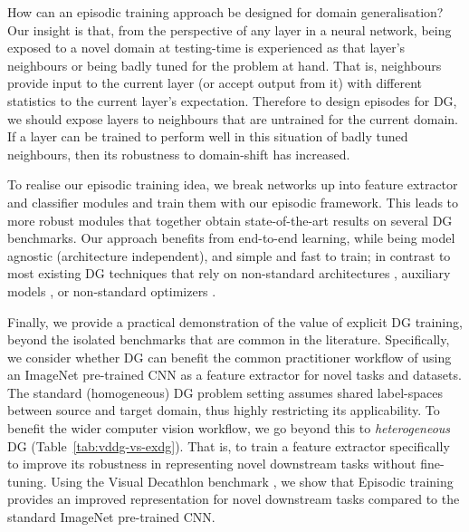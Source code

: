 \documentclass[10pt,twocolumn,letterpaper]{article}
\begin{document}
How can an episodic training approach be designed for domain generalisation? Our insight is that, from the perspective of any layer  in a neural network, being exposed to a novel domain at testing-time is experienced as that layer's neighbours  or  being badly tuned for the problem at hand. That is,  neighbours provide input to the current layer (or accept output from it) with different statistics to the current layer's expectation. Therefore to design episodes for DG, we should expose layers to neighbours that are untrained for the current domain. If a layer can be trained to perform  well in this situation of badly tuned neighbours, then its robustness to domain-shift has increased. 

To realise our episodic training idea, we break networks up into feature extractor and classifier modules and train them with our episodic framework. This leads to more robust modules that together obtain state-of-the-art results on several DG benchmarks. Our approach benefits from end-to-end learning, while being model agnostic (architecture independent), and simple and fast to train; in contrast to most existing DG techniques that rely on non-standard architectures \cite{Li2017dg}, auxiliary models \cite{shankar2018generalizing}, or non-standard optimizers \cite{Li2018MLDG}.  

Finally, we provide a practical demonstration of the value of explicit DG training, beyond the isolated benchmarks that are common in the literature. Specifically, we consider whether DG can benefit the common practitioner workflow of using an ImageNet \cite{russakovsky2015ilsvrc} pre-trained CNN as a feature extractor for novel tasks and datasets. The standard (homogeneous) DG problem setting assumes shared label-spaces between source and target domain, thus highly restricting its applicability. To benefit the wider computer vision workflow, we go beyond this to \emph{heterogeneous} DG (Table~\ref{tab:vddg-vs-exdg}). That is, to train a feature extractor specifically to improve its robustness in representing novel downstream tasks without fine-tuning. Using the Visual Decathlon benchmark \cite{Rebuffi17}, we show that Episodic training provides an improved representation for novel downstream tasks compared to the standard ImageNet pre-trained CNN.
\end{document}
